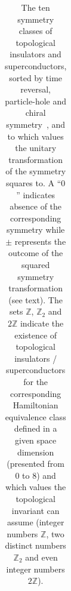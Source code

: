 \begin{table}
\begin{tabular}{l | c c c | l l l l l l l l l}
        \hline\hline
    \end{tabular}
    \addtolength{\tabcolsep}{-0.25cm}
    \caption{The ten symmetry classes of topological insulators and superconductors, sorted by time reversal, particle-hole and chiral symmetry~\cite{Altland1997}, and to which values the unitary transformation of the symmetry squares to. A ``$0$'' indicates absence of the corresponding symmetry while $\pm$ represents the outcome of the squared symmetry transformation (see text). The sets $\mathds Z$, $\mathds Z_2$ and $2\mathds Z$ indicate the existence of topological insulators / superconductors for the corresponding Hamiltonian equivalence class defined in a given space dimension (presented from $0$ to $8$) and which values the topological invariant can assume (integer numbers $\mathds Z$, two distinct numbers $\mathds Z_2$ and even integer numbers $2\mathds Z$).}
    \label{tab:symmetry_classes}
\end{table}

